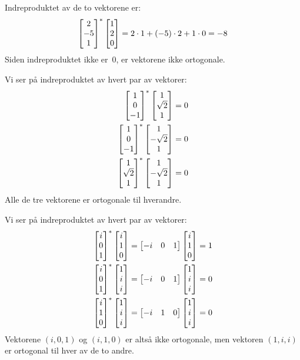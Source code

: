 \begin{losning}
\begin{punkt}
Indreproduktet av de to vektorene er:
\[
\begin{bmatrix} 2 \\ -5 \\ 1 \end{bmatrix}^*
\begin{bmatrix} 1 \\ 2 \\ 0 \end{bmatrix}
= 2 \cdot 1 + (-5) \cdot 2 + 1 \cdot 0 = -8
\]
Siden indreproduktet ikke er~$0$, er vektorene ikke ortogonale.
\end{punkt}

\begin{punkt}
Vi ser på indreproduktet av hvert par av vektorer:
\begin{align*}
\begin{bmatrix} 1 \\ 0 \\ -1 \end{bmatrix}^* \begin{bmatrix} 1 \\ \sqrt{2} \\ 1 \end{bmatrix}  &= 0 \\
\begin{bmatrix} 1 \\ 0 \\ -1 \end{bmatrix}^* \begin{bmatrix} 1 \\ -\sqrt{2} \\ 1 \end{bmatrix} &= 0 \\
\begin{bmatrix} 1 \\ \sqrt{2} \\ 1 \end{bmatrix}^* \begin{bmatrix} 1 \\ -\sqrt{2} \\ 1 \end{bmatrix} &= 0
\end{align*}
Alle de tre vektorene er ortogonale til hverandre.
\end{punkt}

\begin{punkt}
Vi ser på indreproduktet av hvert par av vektorer:
\begin{align*}
\begin{bmatrix} i \\ 0 \\ 1 \end{bmatrix}^* \begin{bmatrix} i \\ 1 \\ 0 \end{bmatrix}
&= \begin{bmatrix} -i & 0 & 1 \end{bmatrix} \begin{bmatrix} i \\ 1 \\ 0 \end{bmatrix}
 = 1 \\
\begin{bmatrix} i \\ 0 \\ 1 \end{bmatrix}^* \begin{bmatrix} 1 \\ i \\ i \end{bmatrix}
&= \begin{bmatrix} -i & 0 & 1 \end{bmatrix} \begin{bmatrix} 1 \\ i \\ i \end{bmatrix}
 = 0 \\
\begin{bmatrix} i \\ 1 \\ 0 \end{bmatrix}^* \begin{bmatrix} 1 \\ i \\ i \end{bmatrix}
&= \begin{bmatrix} -i & 1 & 0 \end{bmatrix} \begin{bmatrix} 1 \\ i \\ i \end{bmatrix}
 = 0
\end{align*}
Vektorene $(i,0,1)$ og $(i,1,0)$ er altså ikke ortogonale,
men vektoren $(1,i,i)$ er ortogonal til hver av de to andre.
\end{punkt}

\end{losning}


